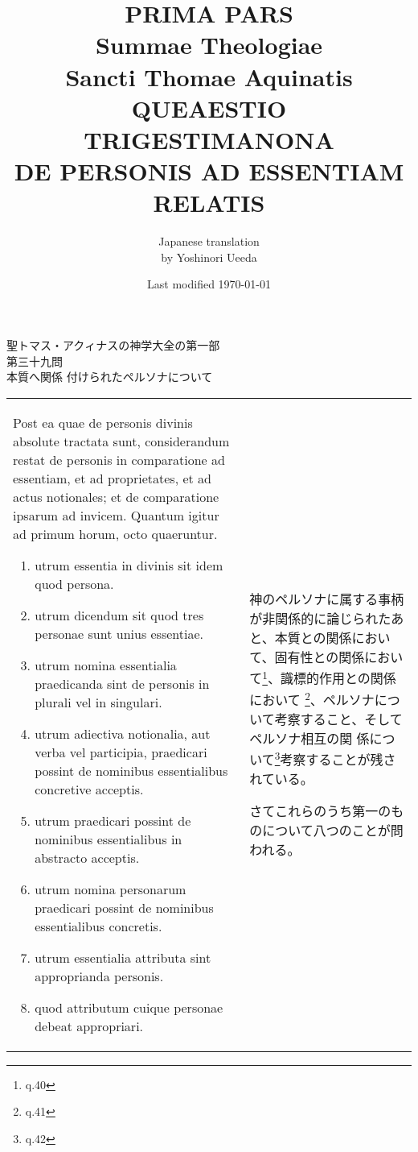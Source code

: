 \documentclass[10pt]{jsarticle} %
\title{{\bf PRIMA PARS}\\{\Huge Summae Theologiae}\\Sancti Thomae
Aquinatis\\{\sffamily QUEAESTIO TRIGESTIMANONA}\\DE PERSONIS AD
ESSENTIAM RELATIS}
\author{Japanese translation\\by Yoshinori {\sc Ueeda}}
\date{Last modified \today}
\begin{document}
\maketitle


\begin{center}
{\Large 聖トマス・アクィナスの神学大全の第一部\\第三十九問\\本質へ関係
 付けられたペルソナについて}
\end{center}




\newpage
\begin{longtable}{p{21em}p{21em}}

{\Huge P}ost ea quae de personis divinis absolute tractata sunt, considerandum
 restat de personis in comparatione ad essentiam, et ad proprietates, et
 ad actus notionales; et de comparatione ipsarum ad invicem. Quantum
 igitur ad primum horum, octo quaeruntur. 

\begin{enumerate}
 \item utrum essentia in divinis sit idem quod persona.
 \item utrum dicendum sit quod tres personae sunt unius essentiae.
 \item utrum nomina essentialia praedicanda sint de personis in plurali
       vel in singulari.
 \item utrum adiectiva notionalia, aut verba vel participia, praedicari
       possint de nominibus essentialibus concretive acceptis.
 \item utrum praedicari possint de nominibus essentialibus in abstracto
       acceptis.
 \item utrum nomina personarum praedicari possint de nominibus
       essentialibus concretis.
 \item utrum essentialia attributa sint approprianda personis.
 \item quod attributum cuique personae debeat appropriari.
\end{enumerate}


&


神のペルソナに属する事柄が非関係的に論じられたあと、本質との関係におい
て、固有性との関係において\footnote{q.40}、識標的作用との関係において
\footnote{q.41}、ペルソナについて考察すること、そしてペルソナ相互の関
係について\footnote{q.42}考察することが残されている。

さてこれらのうち第一のものについて八つのことが問われる。


\end{longtable}
\end{document}
